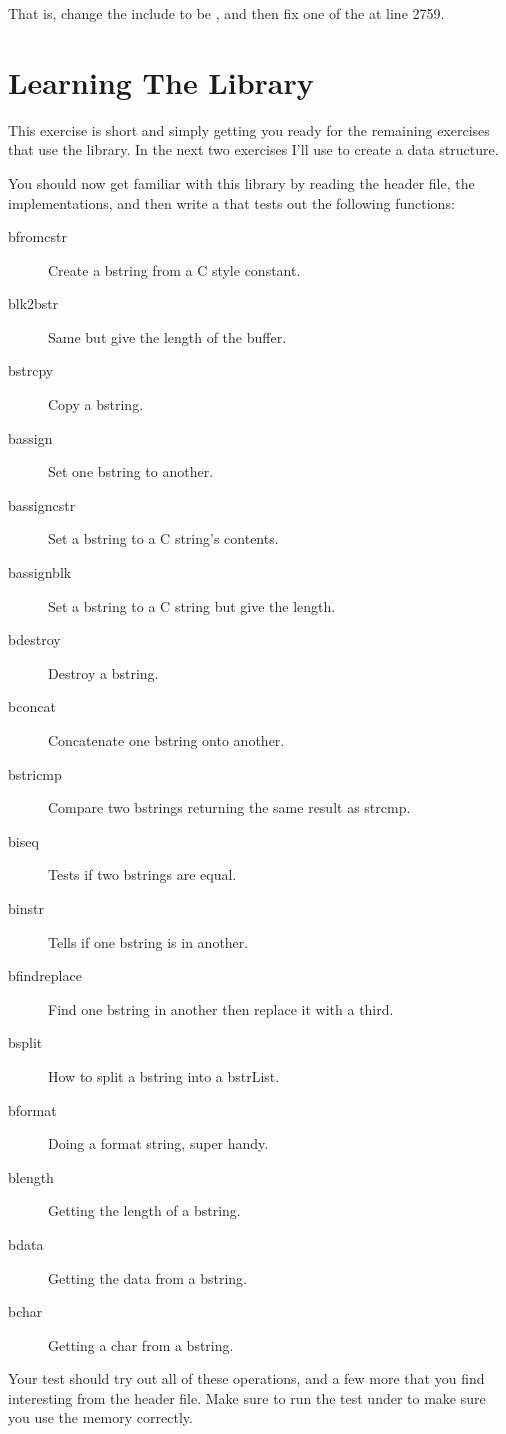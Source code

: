 That is, change the include to be , and then
fix one of the  at line 2759.

\section{Learning The Library}

This exercise is short and simply getting you ready for the remaining 
exercises that use the library.  In the next two exercises I'll use
 to create a  data structure.

You should now get familiar with this library by reading the 
header file, the implementations, and then write a 
that tests out the following functions:

\begin{description}
\item[bfromcstr] Create a bstring from a C style constant.
\item[blk2bstr] Same but give the length of the buffer.
\item[bstrcpy] Copy a bstring.
\item[bassign] Set one bstring to another.
\item[bassigncstr] Set a bstring to a C string's contents.
\item[bassignblk] Set a bstring to a C string but give the length.
\item[bdestroy] Destroy a bstring.
\item[bconcat] Concatenate one bstring onto another.
\item[bstricmp] Compare two bstrings returning the same result as strcmp.
\item[biseq] Tests if two bstrings are equal.
\item[binstr] Tells if one bstring is in another.
\item[bfindreplace] Find one bstring in another then replace it with a third.
\item[bsplit] How to split a bstring into a bstrList.
\item[bformat] Doing a format string, super handy.
\item[blength] Getting the length of a bstring.
\item[bdata] Getting the data from a bstring.
\item[bchar] Getting a char from a bstring.
\end{description}

Your test should try out all of these operations, and a few more that you
find interesting from the header file.  Make sure to run the test under
 to make sure you use the memory correctly.

